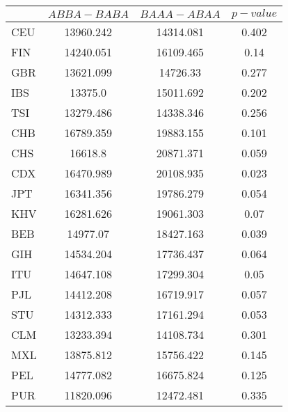 \begin{tabular}{@{}lccc@{}}
\toprule
 & $ABBA-BABA$ & $BAAA-ABAA$ & $p-value$ \\
\midrule
CEU & 13960.242 & 14314.081 & 0.402 \\
FIN & 14240.051 & 16109.465 & 0.14 \\
GBR & 13621.099 & 14726.33 & 0.277 \\
IBS & 13375.0 & 15011.692 & 0.202 \\
TSI & 13279.486 & 14338.346 & 0.256 \\
CHB & 16789.359 & 19883.155 & 0.101 \\
CHS & 16618.8 & 20871.371 & 0.059 \\
CDX & 16470.989 & 20108.935 & 0.023 \\
JPT & 16341.356 & 19786.279 & 0.054 \\
KHV & 16281.626 & 19061.303 & 0.07 \\
BEB & 14977.07 & 18427.163 & 0.039 \\
GIH & 14534.204 & 17736.437 & 0.064 \\
ITU & 14647.108 & 17299.304 & 0.05 \\
PJL & 14412.208 & 16719.917 & 0.057 \\
STU & 14312.333 & 17161.294 & 0.053 \\
CLM & 13233.394 & 14108.734 & 0.301 \\
MXL & 13875.812 & 15756.422 & 0.145 \\
PEL & 14777.082 & 16675.824 & 0.125 \\
PUR & 11820.096 & 12472.481 & 0.335 \\
\bottomrule
\end{tabular}
